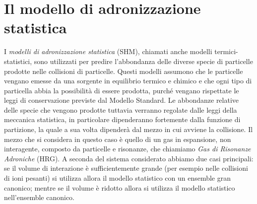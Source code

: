 \section{Il modello di adronizzazione statistica}
I \emph{modelli di adronizzazione statistica} (SHM), chiamati anche modelli termici-statistici, sono utilizzati per predire l'abbondanza delle diverse specie di particelle prodotte nelle collisioni di particelle.
Questi modelli assumono che le particelle vengano emesse da una sorgente in equilibrio termico e chimico e che ogni tipo di particella abbia la possibilità di essere prodotta, purché vengano rispettate le leggi di conservazione previste dal Modello Standard.
Le abbondanze relative delle specie che vengono prodotte tuttavia verranno regolate dalle leggi della meccanica statistica, in particolare dipenderanno fortemente dalla funzione di partizione, la quale a sua volta dipenderà dal mezzo in cui avviene la collisione.
Il mezzo che si considera in questo caso è quello di un gas in espansione, non interagente, composto da particelle e risonanze, che chiamiamo \emph{Gas di Risonanze Adroniche} (HRG).
A seconda del sistema  considerato abbiamo due casi principali: se il volume di interazione è sufficientemente grande (per esempio nelle collisioni di ioni pesanti) si utilizza allora il modello statistico con un ensemble gran canonico; mentre se il volume è ridotto allora si utilizza il modello statistico nell'ensemble canonico.\\

